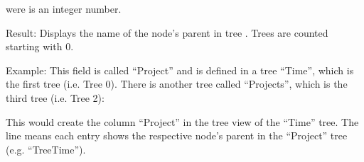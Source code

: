 \documentclass[letterpaper,10pt,english]{sphinxmanual}
\begin{document}
\begin{sphinxVerbatim}[commandchars=\\\{\}]
 
     
     \PYG{p}{[}\PYG{p}{]}
     \PYG{p}{[}\PYG{p}{]}
     \PYG{p}{[}\PYG{p}{]}
     \PYG{p}{[}\PYG{p}{]}
\end{sphinxVerbatim}

\sphinxAtStartPar
were  is an integer number.

\sphinxAtStartPar
Result: Displays the name of the node’s parent in tree . Trees are counted starting with 0.

\sphinxAtStartPar
Example: This field is called “Project” and is defined in a tree “Time”, which is the first tree (i.e. Tree 0). There is another tree called “Projects”, which is the third tree (i.e. Tree 2):

\begin{sphinxVerbatim}[commandchars=\\\{\}]
 
     
         
         \PYG{p}{[}\PYG{p}{]}
         \PYG{p}{[}\PYG{p}{]}
         \PYG{p}{[}\PYG{p}{]}
         \PYG{p}{[}\PYG{p}{]}

 

 
\end{sphinxVerbatim}

\sphinxAtStartPar
This would create the column “Project” in the tree view of the “Time” tree. The line  means each entry shows the respective node’s parent in the “Project” tree (e.g. “TreeTime”).
\end{document}

